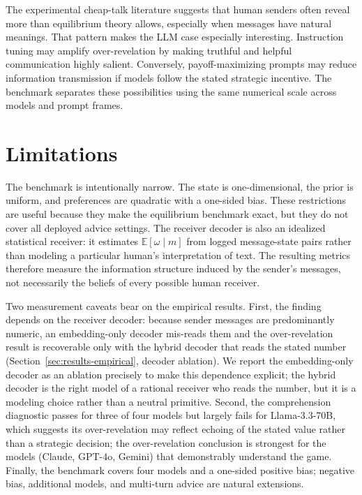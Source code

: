 \documentclass[11pt]{article}
\newcommand{\E}{\mathbb{E}}
\begin{document}
The experimental cheap-talk literature suggests that human senders often reveal more than equilibrium theory allows, especially when messages have natural meanings.  That pattern makes the LLM case especially interesting.  Instruction tuning may amplify over-revelation by making truthful and helpful communication highly salient.  Conversely, payoff-maximizing prompts may reduce information transmission if models follow the stated strategic incentive.  The benchmark separates these possibilities using the same numerical scale across models and prompt frames.

\section{Limitations}\label{sec:limitations}

The benchmark is intentionally narrow.  The state is one-dimensional, the prior is uniform, and preferences are quadratic with a one-sided bias.  These restrictions are useful because they make the equilibrium benchmark exact, but they do not cover all deployed advice settings.  The receiver decoder is also an idealized statistical receiver: it estimates $\E[\omega\mid m]$ from logged message-state pairs rather than modeling a particular human's interpretation of text.  The resulting metrics therefore measure the information structure induced by the sender's messages, not necessarily the beliefs of every possible human receiver.

Two measurement caveats bear on the empirical results.  First, the finding depends on the receiver decoder: because sender messages are predominantly numeric, an embedding-only decoder mis-reads them and the over-revelation result is recoverable only with the hybrid decoder that reads the stated number (Section~\ref{sec:results-empirical}, decoder ablation).  We report the embedding-only decoder as an ablation precisely to make this dependence explicit; the hybrid decoder is the right model of a rational receiver who reads the number, but it is a modeling choice rather than a neutral primitive.  Second, the comprehension diagnostic passes for three of four models but largely fails for Llama-3.3-70B, which suggests its over-revelation may reflect echoing of the stated value rather than a strategic decision; the over-revelation conclusion is strongest for the models (Claude, GPT-4o, Gemini) that demonstrably understand the game.  Finally, the benchmark covers four models and a one-sided positive bias; negative bias, additional models, and multi-turn advice are natural extensions.
\end{document}
